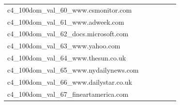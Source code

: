 \documentclass[dvipsnames]{article}
\begin{document}
\begin{appendix}
{\begin{longtable}{m{6cm}m{1.7cm}m{1.7cm}m{1.7cm}m{1.7cm}m{1.7cm}}
	c4\_100dom\_val\_60\_www.csmonitor.com  & \colorbox[HTML]{fefee3}{\makebox[\mywidth][c]{15.35}} & \colorbox[HTML]{eff8b3}{\makebox[\mywidth][c]{14.85}} & \colorbox[HTML]{ffffe5}{\makebox[\mywidth][c]{15.92}} & \colorbox[HTML]{daf0a4}{\makebox[\mywidth][c]{14.75}} & \colorbox[HTML]{77c578}{\makebox[\mywidth][c]{14.57}}\\
	c4\_100dom\_val\_61\_www.adweek.com  & \colorbox[HTML]{fcfed9}{\makebox[\mywidth][c]{14.55}} & \colorbox[HTML]{bde395}{\makebox[\mywidth][c]{13.95}} & \colorbox[HTML]{ffffe5}{\makebox[\mywidth][c]{15.58}} & \colorbox[HTML]{e2f3a9}{\makebox[\mywidth][c]{14.09}} & \colorbox[HTML]{77c578}{\makebox[\mywidth][c]{13.81}}\\
	c4\_100dom\_val\_62\_docs.microsoft.com  & \colorbox[HTML]{c5e799}{\makebox[\mywidth][c]{7.69}} & \colorbox[HTML]{e4f4ab}{\makebox[\mywidth][c]{7.79}} & \colorbox[HTML]{ffffe5}{\makebox[\mywidth][c]{8.86}} & \colorbox[HTML]{bde395}{\makebox[\mywidth][c]{7.68}} & \colorbox[HTML]{77c578}{\makebox[\mywidth][c]{7.58}}\\
	c4\_100dom\_val\_63\_www.yahoo.com  & \colorbox[HTML]{fefee2}{\makebox[\mywidth][c]{9.29}} & \colorbox[HTML]{d0ec9e}{\makebox[\mywidth][c]{8.88}} & \colorbox[HTML]{ffffe5}{\makebox[\mywidth][c]{9.71}} & \colorbox[HTML]{d8efa2}{\makebox[\mywidth][c]{8.89}} & \colorbox[HTML]{77c578}{\makebox[\mywidth][c]{8.77}}\\
	c4\_100dom\_val\_64\_www.thesun.co.uk  & \colorbox[HTML]{fefee3}{\makebox[\mywidth][c]{12.18}} & \colorbox[HTML]{ecf7b1}{\makebox[\mywidth][c]{11.66}} & \colorbox[HTML]{ffffe5}{\makebox[\mywidth][c]{12.74}} & \colorbox[HTML]{def2a6}{\makebox[\mywidth][c]{11.59}} & \colorbox[HTML]{77c578}{\makebox[\mywidth][c]{11.39}}\\
	c4\_100dom\_val\_65\_www.nydailynews.com  & \colorbox[HTML]{ffffe5}{\makebox[\mywidth][c]{12.15}} & \colorbox[HTML]{ebf7b0}{\makebox[\mywidth][c]{11.60}} & \colorbox[HTML]{ffffe5}{\makebox[\mywidth][c]{12.61}} & \colorbox[HTML]{e5f4ab}{\makebox[\mywidth][c]{11.56}} & \colorbox[HTML]{77c578}{\makebox[\mywidth][c]{11.36}}\\
	c4\_100dom\_val\_66\_www.dailystar.co.uk  & \colorbox[HTML]{ffffe5}{\makebox[\mywidth][c]{10.65}} & \colorbox[HTML]{f3fab6}{\makebox[\mywidth][c]{10.17}} & \colorbox[HTML]{ffffe5}{\makebox[\mywidth][c]{11.03}} & \colorbox[HTML]{e2f3a9}{\makebox[\mywidth][c]{10.09}} & \colorbox[HTML]{77c578}{\makebox[\mywidth][c]{9.92}}\\
	c4\_100dom\_val\_67\_fineartamerica.com  & \colorbox[HTML]{ffffe5}{\makebox[\mywidth][c]{12.06}} & \colorbox[HTML]{f6fbb8}{\makebox[\mywidth][c]{11.58}} & \colorbox[HTML]{ffffe5}{\makebox[\mywidth][c]{12.29}} & \colorbox[HTML]{d1ec9f}{\makebox[\mywidth][c]{11.46}} & \colorbox[HTML]{77c578}{\makebox[\mywidth][c]{11.36}}\\

\end{longtable}}
\end{appendix}
\end{document}
